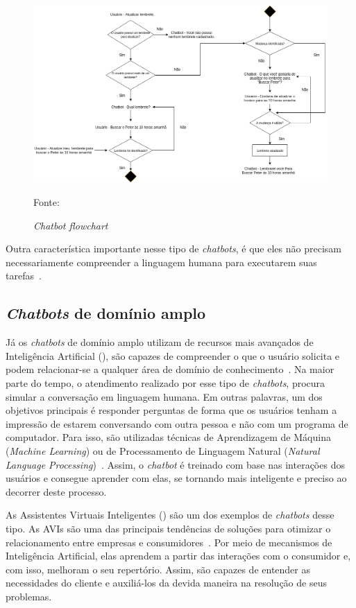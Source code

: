 \begin{figure}[htb!]
\centering
\includegraphics[width=0.9\linewidth]{src/imagens/Chatbot.png}
\caption{\textit{Chatbot flowchart}} Fonte:~\cite{Samer}
\label{cap:01:fig:fluxograma}
\end{figure}

Outra característica importante nesse tipo de \textit{chatbots}, é que eles não precisam necessariamente compreender a linguagem humana para executarem suas tarefas~\cite{Juliano}.

\subsection{\textit{Chatbots} de domínio amplo}\label{cap:02:sec:01:sub:02:bot-dominio}

Já os \textit{chatbots} de domínio amplo utilizam de recursos mais avançados de Inteligência Artificial (), são capazes de compreender o que o usuário solicita e podem relacionar-se a qualquer área de domínio de conhecimento~\cite{Juliano}. 
Na maior parte do tempo, o atendimento realizado por esse tipo de \textit{chatbots}, procura simular a conversação em linguagem humana.
Em outras palavras, um dos objetivos principais é responder perguntas de forma que os usuários tenham a impressão de estarem conversando com outra pessoa e não com um programa de computador.
Para isso, são utilizadas técnicas de Aprendizagem de Máquina (\textit{Machine Learning}) ou de Processamento de Linguagem Natural (\textit{Natural Language Processing})~\cite{Falaki}. 
Assim, o \textit{chatbot} é treinado com base nas interações dos usuários e consegue aprender com elas, se tornando mais inteligente e preciso ao decorrer deste processo.

As Assistentes Virtuais Inteligentes () são um dos exemplos de \textit{chatbots} desse tipo. 
As AVIs são uma das principais tendências de soluções para otimizar o relacionamento entre empresas e consumidores~\cite{DDS}. 
Por meio de mecanismos de Inteligência Artificial, elas aprendem a partir das interações com o consumidor e, com isso, melhoram o seu repertório. 
Assim, são capazes de entender as necessidades do cliente e auxiliá-los da devida maneira na resolução de seus problemas.

